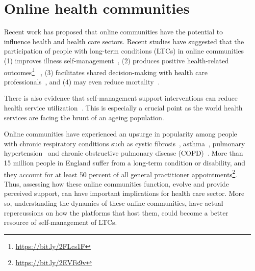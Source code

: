 \section{Online health communities}
Recent work has proposed that online communities have the potential to influence health and health care sectors. Recent studies have suggested that the participation of people with long-term conditions (LTCs) in online communities (1) improves illness self-management~\cite{allen2016long}, (2) produces positive health-related outcomes\footnote{\url{https://bit.ly/2FLcs1F}}~\cite{mo2012developing,pendry2015individual} , (3) facilitates shared decision-making with health care professionals~\cite{bartlett2011investigation,izuka2017stroke}, and (4) may even reduce mortality~\cite{hobbs2016online}.

There is also evidence that self-management support interventions can reduce health service utilization~\cite{panagioti2014self,taylor2014rapid}. This is especially a crucial point as the world health services are facing the brunt of an ageing population.

Online communities have experienced an upsurge in popularity among people with chronic respiratory conditions such as cystic fibrosis~\cite{kirk2016exploration}, asthma~\cite{stewart2011online}, pulmonary hypertension~\cite{matura2013virtual} and chronic obstructive pulmonary disease (COPD)~\cite{wentzer2013narratives}. More than 15 million people in England suffer from a long-term condition or disability, and they account for at least 50 percent of all general practitioner appointments\footnote{\url{https://bit.ly/2EVFs9v}}. Thus, assessing how these online communities function, evolve and provide perceived support, can have important implications for health care sector. More so, understanding the dynamics of these online communities, have actual repercussions on how the platforms that host them, could become a better resource of self-management of LTCs.


